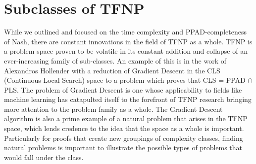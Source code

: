 \documentclass[10pt]{article}
\theoremstyle{definition}
\theoremstyle{remark}
\theoremstyle{definition}
\begin{document}
\section{Subclasses of TFNP}
While we outlined and focused on the time complexity and PPAD-completeness of Nash, there are constant innovations in the field of TFNP as a whole. TFNP is a problem space proven to be volatile in its constant addition and collapse of an ever-increasing family of sub-classes. An example of this is in the work of Alexandros Hollender with a reduction of Gradient Descent in the CLS (Continuous Local Search) space to a problem which proves that CLS = PPAD $\cap$ PLS. The problem of Gradient Descent is one whose applicability to fields like machine learning has catapulted itself to the forefront of TFNP research bringing more attention to the problem family as a whole.  The Gradient Descent algorithm is also a prime example of a natural problem that arises in the TFNP space, which lends credence to the idea that the space as a whole is important. Particularly for proofs that create new groupings of complexity classes, finding natural problems is important to illustrate the possible types of problems that would fall under the class. 



\end{document}
